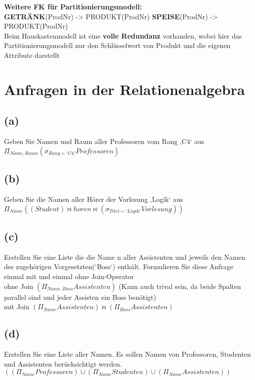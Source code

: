 \documentclass{article}
\begin{document}
\textbf{Weitere FK für Partitionierungsmodell:}\\
\textbf{GETRÄNK}(ProdNr) -> PRODUKT(ProdNr)
\textbf{SPEISE}(ProdNr) -> PRODUKT(ProdNr)\\

Beim Hauskastenmodell ist eine \textbf{volle Redundanz} vorhanden, wobei hier das Partitionierungsmodell
nur den Schlüsselwert von Produkt und die eigenen Attribute darstellt

\section{Anfragen in der Relationenalgebra}
\subsection{(a)}
Geben Sie Namen und Raum aller Professoren vom Rang ‚C4‘ aus\\
$\Pi_{Name,Raum}(\sigma_{Rang='C4'} Professoren)$ \\

\subsection{(b)}
Geben Sie die Namen aller Hörer der Vorlesung ‚Logik‘ aus
$\Pi_{Name}((Student) \bowtie horen \bowtie (\sigma_{Titel='Logik'}Vorlesung))$ \\

\subsection{(c)}
Erstellen Sie eine Liste die die Name n aller Assistenten und jeweils den
Namen des zugehörigen Vorgesetzten(‘Boss‘) enthält. Formulieren Sie diese Anfrage einmal mit und einmal 
ohne Join-Operator\\
ohne Join $(\Pi_{Name, Boss} Assistenten)$ (Kann auch trival sein, da beide Spalten parallel sind und jeder Assisten ein Boss benötigt)\\
mit Join $(\Pi_{Name} Assistenten) \bowtie (\Pi_{Boss} Assistenten)$


\subsection{(d)}
Erstellen Sie eine Liste aller Namen. Es sollen Namen von Professoren,
Studenten und Assistenten berücksichtigt werden. \\
$((\Pi_{Name} Professoren) \cup (\Pi_{Name} Studenten) \cup (\Pi_{Name} Assistenten))$
\end{document}
